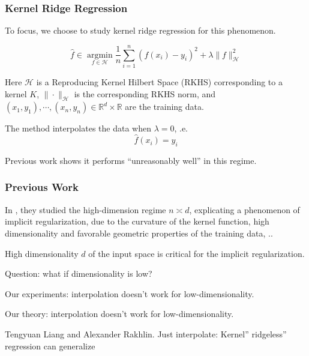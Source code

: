 \documentclass{beamer}   	%
\theoremstyle{definition}
\newcommand{\argmin}{\mathop{\text{argmin}}}
\begin{document}
\begin{frame}
\frametitle{Kernel Ridge Regression}
To focus, we choose to study kernel ridge regression for this phenomenon.

\begin{equation}
	\hat{f}\in\argmin\limits_{f\in \mathcal{H}} \frac{1}{n}\sum\limits_{i=1}^n(f(x_i)-y_i)^2+ \lambda \|f\|_\mathcal{H}^2
\end{equation}

Here $\mathcal{H}$ is a Reproducing Kernel Hilbert Space (RKHS) corresponding to a kernel $K$, $\|\cdot\|_\mathcal{H}$ is the corresponding RKHS norm, and $(x_1,y_1),\cdots,(x_n,y_n)\in \mathbb{R}^d\times \mathbb{R}$ are the training data.

The method interpolates the data when $\lambda = 0$, .e.
\begin{equation}
	\hat{f}(x_i)=y_i
\end{equation}

Previous work shows it performs ``unreasonably well'' in this regime.

\end{frame}

\begin{frame}
\frametitle{Previous Work}
In \cite{jint}, they studied the high-dimension regime $n\asymp d$, explicating a phenomenon of implicit regularization, due to the curvature of the kernel function, high dimensionality and favorable geometric properties of the training data, ..

High dimensionality $d$ of the input space is critical for the implicit regularization.

Question: what if dimensionality is low?

Our experiments: interpolation doesn't work for low-dimensionality.

Our theory: interpolation doesn't work for low-dimensionality.

\begin{thebibliography}{9}
\scriptsize
{}
Tengyuan Liang and Alexander Rakhlin. Just interpolate: Kernel” ridgeless” regression can generalize
\end{thebibliography}
\end{frame}
\end{document}
